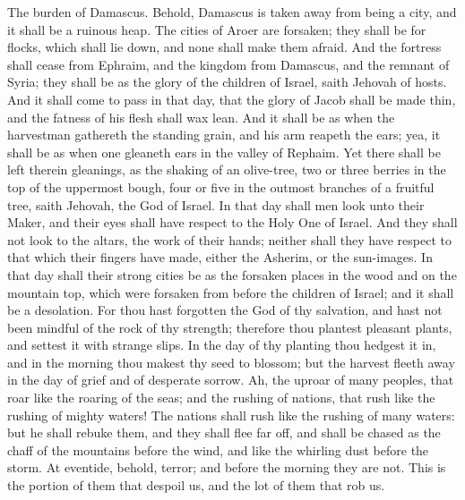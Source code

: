 The burden of Damascus. Behold, Damascus is taken away from being a city, and it shall be a ruinous heap. The cities of Aroer are forsaken; they shall be for flocks, which shall lie down, and none shall make them afraid. And the fortress shall cease from Ephraim, and the kingdom from Damascus, and the remnant of Syria; they shall be as the glory of the children of Israel, saith Jehovah of hosts.  And it shall come to pass in that day, that the glory of Jacob shall be made thin, and the fatness of his flesh shall wax lean. And it shall be as when the harvestman gathereth the standing grain, and his arm reapeth the ears; yea, it shall be as when one gleaneth ears in the valley of Rephaim. Yet there shall be left therein gleanings, as the shaking of an olive-tree, two or three berries in the top of the uppermost bough, four or five in the outmost branches of a fruitful tree, saith Jehovah, the God of Israel. In that day shall men look unto their Maker, and their eyes shall have respect to the Holy One of Israel. And they shall not look to the altars, the work of their hands; neither shall they have respect to that which their fingers have made, either the Asherim, or the sun-images. In that day shall their strong cities be as the forsaken places in the wood and on the mountain top, which were forsaken from before the children of Israel; and it shall be a desolation. For thou hast forgotten the God of thy salvation, and hast not been mindful of the rock of thy strength; therefore thou plantest pleasant plants, and settest it with strange slips. In the day of thy planting thou hedgest it in, and in the morning thou makest thy seed to blossom; but the harvest fleeth away in the day of grief and of desperate sorrow.  Ah, the uproar of many peoples, that roar like the roaring of the seas; and the rushing of nations, that rush like the rushing of mighty waters! The nations shall rush like the rushing of many waters: but he shall rebuke them, and they shall flee far off, and shall be chased as the chaff of the mountains before the wind, and like the whirling dust before the storm. At eventide, behold, terror; and before the morning they are not. This is the portion of them that despoil us, and the lot of them that rob us. 

